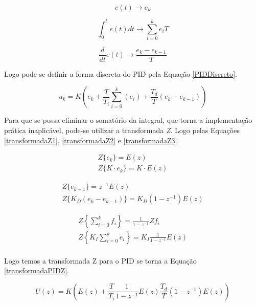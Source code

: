 	\begin{equation}
		e(t) \rightarrow e_k
		\label{erro}
	\end{equation}
		
	\begin{equation}
		\int_0^t e(t) dt \rightarrow \sum_{i=0}^{k} e_i T
		\label{integral}
	\end{equation}
	
	\begin{equation}
		\frac{d}{dt} e(t) \rightarrow \frac{e_k - e_{k-1}}{T}
		\label{derivada}
	\end{equation}
	
	Logo pode-se definir a forma discreta do PID pela Equação \ref{PIDDiscreto}.
	 
	\begin{equation}
	u_k = K \left( e_k + \frac{T}{T_i} \sum_{i=0}^{k} (e_i) + \frac{T_d}{T}(e_k - e_{k-1})\right)
	\label{PIDDiscreto}
	\end{equation}
	
	Para que se possa eliminar o somatório da integral, que torna a implementação prática inaplicável, pode-se utilizar a transformada \emph{Z}. Logo pelas Equações \ref{transformadaZ1}, \ref{transformadaZ2} e \ref{transformadaZ3}.
	
	\begin{eqnarray}
		Z \{ e_k \} = E(z) \\
		Z \{ K \cdot e_k \} = K \cdot E(z)
		\label{transformadaZ1}
	\end{eqnarray}
	
	\begin{eqnarray}
		Z \{ e_{k-1} \} = z^{-1} E(z) \\
		Z \{ K_D ( e_k - e_{k-1}) \} = K_D(1-z^{-1}) E (z)
		\label{transformadaZ2}
	\end{eqnarray}
	
	\begin{eqnarray}
		Z \left\{ \sum_{i=0}^{k} f_i \right\} = \frac{1}{1 - z^{-1}} Z{f_i} \\
		Z \left\{ K_I \sum_{i = 0}^{k} e_i \right\} = K_I \frac{1}{1 - z^{-1}} E(z) \\
		\label{transformadaZ3}		
	\end{eqnarray}
	
	Logo temos a transformada Z para o PID se torna a Equação \ref{transformadaPIDZ}.
	
	\begin{equation}
		U(z) = K \left( E(z) + \frac{T}{T_i} \frac{1}{1 - z^{-1}} E(z) \frac{T_d}{T} (1 - z^{-1}) E(z) \right)
		\label{transformadaPIDZ}
	\end{equation} 
	
